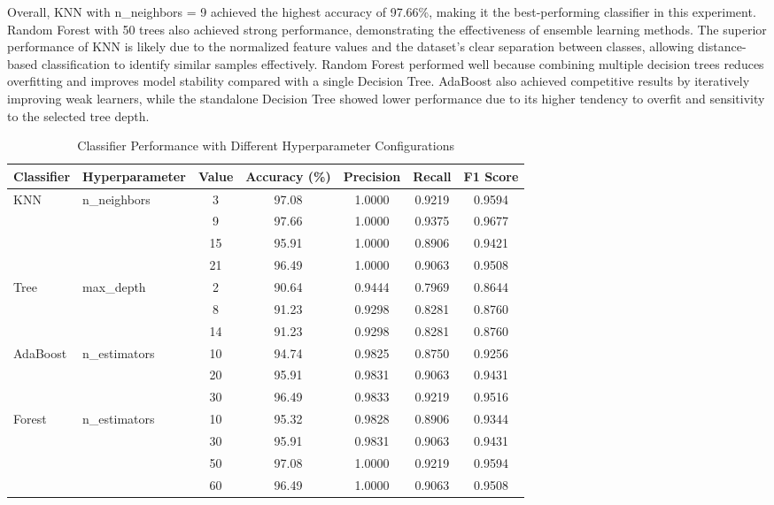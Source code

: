 \documentclass[a4paper,12pt]{article}
\begin{document}
Overall, KNN with n\_neighbors = 9 achieved the highest accuracy of 97.66\%, making it the best-performing classifier in this experiment. Random Forest with 50 trees also achieved strong performance, demonstrating the effectiveness of ensemble learning methods. The superior performance of KNN is likely due to the normalized feature values and the dataset's clear separation between classes, allowing distance-based classification to identify similar samples effectively. Random Forest performed well because combining multiple decision trees reduces overfitting and improves model stability compared with a single Decision Tree. AdaBoost also achieved competitive results by iteratively improving weak learners, while the standalone Decision Tree showed lower performance due to its higher tendency to overfit and sensitivity to the selected tree depth.
\begin{table}[h]
	\centering
	\footnotesize
	\setlength{\tabcolsep}{3pt}
	\begin{tabular}{llccccc}
		\hline
		\textbf{Classifier} & \textbf{Hyperparameter} & \textbf{Value} & \textbf{Accuracy (\%)} & \textbf{Precision} & \textbf{Recall} & \textbf{F1 Score} \\
		\hline
		KNN & n\_neighbors & 3  & 97.08 & 1.0000 & 0.9219 & 0.9594 \\
		 & & 9  & 97.66 & 1.0000 & 0.9375 & 0.9677 \\
		 & & 15 & 95.91 & 1.0000 & 0.8906 & 0.9421 \\
		 & & 21 & 96.49 & 1.0000 & 0.9063 & 0.9508 \\
		\hline
		Tree & max\_depth & 2  & 90.64 & 0.9444 & 0.7969 & 0.8644 \\
		 & & 8  & 91.23 & 0.9298 & 0.8281 & 0.8760 \\
		 & & 14 & 91.23 & 0.9298 & 0.8281 & 0.8760 \\
		\hline
		AdaBoost & n\_estimators & 10 & 94.74 & 0.9825 & 0.8750 & 0.9256 \\
		 & & 20 & 95.91 & 0.9831 & 0.9063 & 0.9431 \\
		 & & 30 & 96.49 & 0.9833 & 0.9219 & 0.9516 \\
		\hline
		Forest & n\_estimators & 10 & 95.32 & 0.9828 & 0.8906 & 0.9344 \\
		 & & 30 & 95.91 & 0.9831 & 0.9063 & 0.9431 \\
		 & & 50 & 97.08 & 1.0000 & 0.9219 & 0.9594 \\
		 & & 60 & 96.49 & 1.0000 & 0.9063 & 0.9508 \\
		\hline
	\end{tabular}
	\caption{Classifier Performance with Different Hyperparameter Configurations}
	\label{tab:classifier_hyperparameter_comparison}
\end{table}
\end{document}
